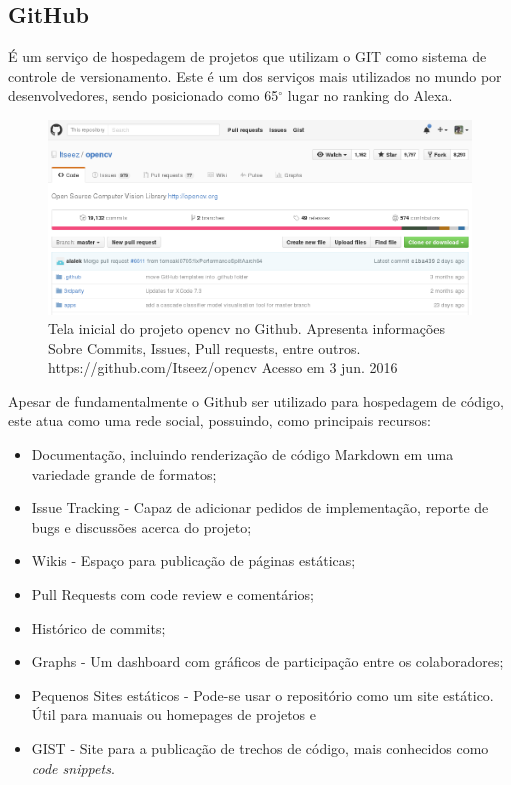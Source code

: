 \documentclass[
	article,			%
	12pt,				%
	oneside,			%
	a4paper,			%
	english,			
	brazil,
	sumario=tradicional
	]{abntex2}
\begin{document}
\pagebreak
\subsection{GitHub}
É um serviço de hospedagem de projetos que utilizam o GIT como sistema de controle de versionamento. Este é um dos serviços mais utilizados no mundo por desenvolvedores, sendo posicionado como 65$^{\circ}$ lugar no ranking do Alexa.
\\
\begin{figure}[!h]
\centering
\includegraphics[scale=0.4]{images/github_main.png}
\caption{Tela inicial do projeto opencv no Github. Apresenta informações Sobre Commits, Issues, Pull requests, entre outros. https://github.com/Itseez/opencv Acesso em 3 jun. 2016}
\label{github_main}
\end{figure}

Apesar de fundamentalmente o Github ser utilizado para hospedagem de código, este atua como uma rede social, possuindo, como principais recursos:

\begin{itemize}
	\item{Documentação, incluindo renderização de código Markdown em uma variedade grande de formatos;}
	\item{Issue Tracking - Capaz de adicionar pedidos de implementação, reporte de bugs e discussões acerca do projeto;}
	\item{Wikis - Espaço para publicação de páginas estáticas;}
	\item{Pull Requests com code review e comentários;}
	\item{Histórico de commits;}
	\item{Graphs - Um dashboard com gráficos de participação entre os colaboradores;}
	\item{Pequenos Sites estáticos - Pode-se usar o repositório como um site estático. Útil para manuais ou homepages de projetos e}
	\item{GIST - Site para a publicação de trechos de código, mais conhecidos como \textit{code snippets}.}
\end{itemize}
\end{document}

